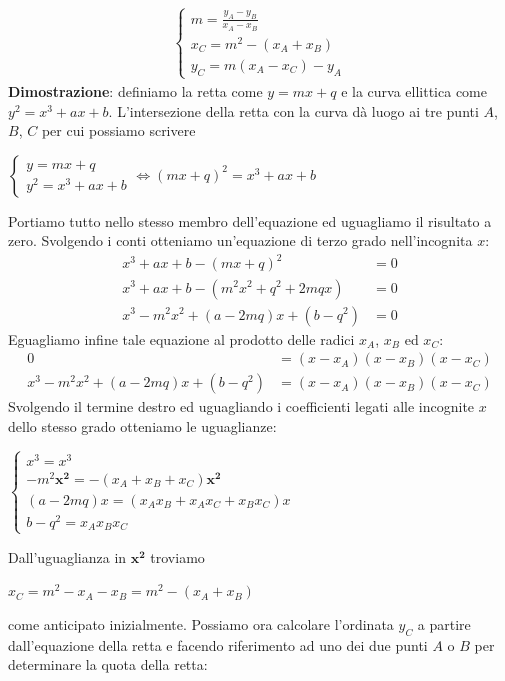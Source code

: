 \documentclass[a4paper,12pt]{tesiinfo}
\newcommand\ddfrac[2]{\frac{\displaystyle #1}{\displaystyle #2}}
\begin{document}
\begin{align*}
\begin{cases}
m = \ddfrac{y_A - y_B}{x_A - x_B}\\
x_C = m^2 - (x_A + x_B)\\
y_C = m(x_A - x_C)-y_A
\end{cases}
\end{align*}
\textbf{Dimostrazione}: definiamo la retta come $y = mx+q$ e la curva ellittica come $y^2 = x^3 + ax+b$. L'intersezione della retta con la curva d\`a luogo ai tre punti $A$, $B$, $C$ per cui possiamo scrivere
\begin{center}$
    \begin{cases}
        y = mx+q\\
        y^2 = x^3 + ax+b
    \end{cases}
     \iff (mx+q)^2 = x^3 + ax+b$
\end{center}
Portiamo tutto nello stesso membro dell'equazione ed uguagliamo il risultato a zero. Svolgendo i conti otteniamo un'equazione di terzo grado nell'incognita $x$:
\begin{align*}
 x^3 + ax+b - (mx+q)^2 &= 0\\
 x^3 + ax+b - (m^2x^2+q^2+2mqx) &= 0\\
 x^3 - m^2x^2 + (a-2mq)x+(b-q^2) &= 0
\end{align*}
Eguagliamo infine tale equazione al prodotto delle radici $x_A$, $x_B$ ed $x_C$:
\begin{align*}
 0 &= (x-x_A)(x-x_B)(x-x_C)\\
 x^3 - m^2x^2 + (a-2mq)x+(b-q^2) &= (x-x_A)(x-x_B)(x-x_C)
\end{align*}
Svolgendo il termine destro ed uguagliando i coefficienti legati alle incognite $x$ dello stesso grado otteniamo le uguaglianze:
\begin{center}
$\begin{cases}
 x^3 = x^3\\
 -m^2\mathbold{x^2} = -(x_A+x_B+x_C)\mathbold{x^2}\\
 (a-2mq)x = (x_Ax_B+x_Ax_C+x_Bx_C)x\\
 b-q^2 = x_Ax_Bx_C
\end{cases}$
\end{center}
Dall'uguaglianza in $\mathbold{x^2}$ troviamo 
\begin{center}
 $x_C = m^2 - x_A - x_B = m^2 - (x_A+x_B)$
\end{center}
come anticipato inizialmente. Possiamo ora calcolare l'ordinata $y_C$ a partire dall'equazione della retta e facendo riferimento ad uno dei due punti $A$ o $B$ per determinare la quota della retta:
\end{document}
